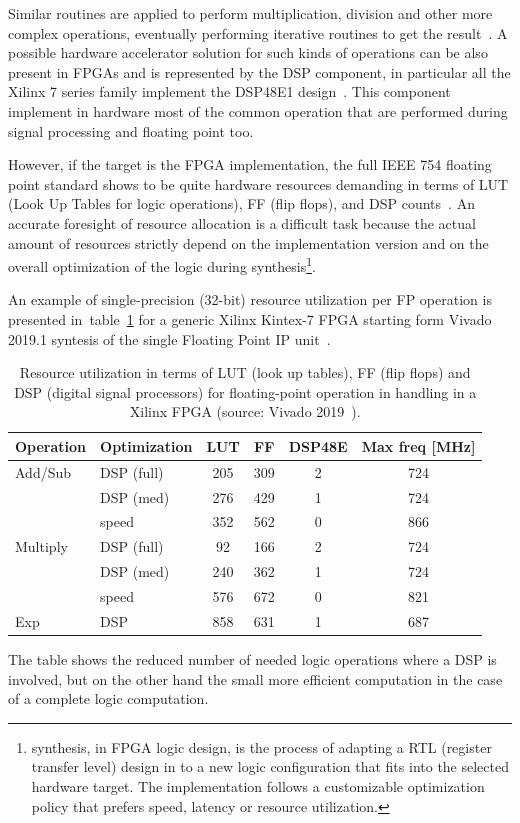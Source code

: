 Similar routines are applied to perform multiplication, division and other more complex operations, eventually performing iterative routines to get the result~\cite{num_lut_for_fp}.
A possible hardware accelerator solution for such kinds of operations can be also present in FPGAs and is represented by the \ac{DSP} component, in particular all the Xilinx 7 series family implement the DSP48E1 design~\cite{xilinx_dsp}. 
This component implement in hardware most of the common operation that are performed during signal processing and floating point too.

However, if the target is the FPGA implementation, the full IEEE 754 floating point standard shows to be quite hardware resources demanding in terms of LUT (Look Up Tables for logic operations), FF (flip flops), and \acs{DSP} counts~\cite{1227254}. 
An accurate foresight of resource allocation is a difficult task because the actual amount of resources strictly depend on the implementation version and on the overall optimization of the logic during synthesis\footnote{ synthesis, in FPGA logic design, is the process of adapting a RTL (register transfer level) design in to a new logic configuration that fits into the selected hardware target. The implementation follows a customizable optimization policy that prefers speed, latency or resource utilization.}.

An example of single-precision (32-bit) resource utilization per FP operation is presented in~table~\ref{tab:kintex_fp_resources} for a generic Xilinx Kintex-7 FPGA starting form Vivado 2019.1 syntesis of the single Floating Point IP unit~\cite{ xilinx_FP_v7.1}.
%
\begin{table}[]
    \centering
    \begin{tabular}{l|l|c|c|c|c}
        \textbf{Operation} & \textbf{Optimization} & \textbf{LUT} & \textbf{FF} & \textbf{DSP48E} & \textbf{Max freq [MHz]} \\
        \hline
        Add/Sub   & DSP (full)    & 205 & 309 & 2 & 724 \\
                  & DSP (med)     & 276 & 429 & 1 & 724 \\
                  & speed         & 352 & 562 & 0 & 866 \\
        Multiply  & DSP (full)    & 92  & 166 & 2 & 724 \\
                  & DSP (med)     & 240 & 362 & 1 & 724 \\
                  & speed         & 576 & 672 & 0 & 821 \\      
        Exp       & DSP           & 858 & 631 & 1 & 687 \\
    \end{tabular}
    \caption{Resource utilization in terms of LUT (look up tables), FF (flip flops) and DSP (digital signal processors) for floating-point operation in handling in a Xilinx FPGA (source: Vivado 2019~\cite{xilinx_FP_resources_v2019}).  }
    \label{tab:kintex_fp_resources}
\end{table}
The table shows the reduced number of needed logic operations where a DSP is involved, but on the other hand the small more efficient computation in the case of a complete logic computation.

